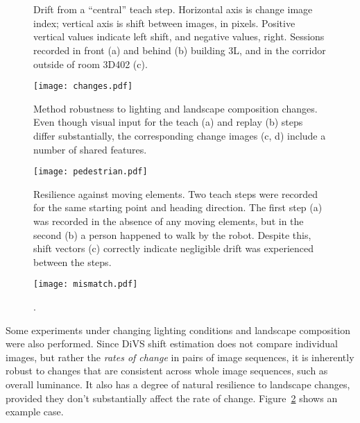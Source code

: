 \documentclass[twocolumn, 9pt,fleqn]{jsproceedings}
\begin{document}
\begin{figure}[h!]
\\
\\
\caption{Drift from a ``central'' teach step. Horizontal axis is change image index; vertical axis is shift between images, in pixels. Positive vertical values indicate left shift, and negative values, right. Sessions recorded in front (a) and behind (b) building 3L, and in the corridor outside of room 3D402 (c).}
\label{fig:tests_turn}
\end{figure}

\begin{figure}[h!]
\centering
\texttt{[image: changes.pdf]}
\caption{Method robustness to lighting and landscape composition changes. Even though visual input for the teach (a) and replay (b) steps differ substantially, the corresponding change images (c, d) include a number of shared features.}
\label{fig:changes}
\end{figure}

\begin{figure}[h!]
\texttt{[image: pedestrian.pdf]}
\caption{Resilience against moving elements. Two teach steps were recorded for the same starting point and heading direction. The first step (a) was recorded in the absence of any moving elements, but in the second (b) a person happened to walk by the robot. Despite this, shift vectors (c) correctly indicate negligible drift was experienced between the steps.}
\label{fig:pedestrian}
\end{figure}

\begin{figure}[h!]
\texttt{[image: mismatch.pdf]}
\caption{.}
\label{fig:mismatch}
\end{figure}

Some experiments under changing lighting conditions and landscape composition were also performed. Since DiVS shift estimation does not compare individual images, but rather the {\it rates of change} in pairs of image sequences, it is inherently robust to changes that are consistent across whole image sequences, such as overall luminance. It also has a degree of natural resilience to landscape changes, provided they don't substantially affect the rate of change. Figure~\ref{fig:changes} shows an example case.
\end{document}
